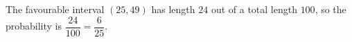 The favourable interval $(25,49)$ has length $24$ out of a total length $100$, so the probability is $\dfrac{24}{100}=\boxed{\dfrac{6}{25}}$.
